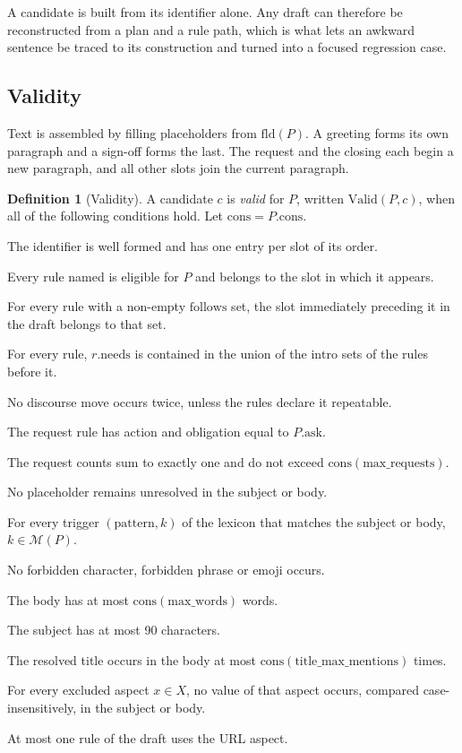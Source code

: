 \documentclass[11pt]{article}
\theoremstyle{definition}
\newtheorem{definition}[theorem]{Definition}
\theoremstyle{remark}
\newcommand{\Valid}{\mathrm{Valid}}
\newcommand{\Mset}{\mathcal{M}}
\begin{document}
A candidate is built from its identifier alone. Any draft can therefore be reconstructed from a plan and a rule path, which is what lets an awkward sentence be traced to its construction and turned into a focused regression case.

\subsection{Validity}

Text is assembled by filling placeholders from $\mathrm{fld}(P)$. A greeting forms its own paragraph and a sign-off forms the last. The request and the closing each begin a new paragraph, and all other slots join the current paragraph.

\begin{definition}[Validity]\label{def:valid2}
A candidate $c$ is \emph{valid} for $P$, written $\Valid(P,c)$, when all of the following conditions hold. Let $\mathrm{cons}=P.\mathrm{cons}$.
\begin{description}[leftmargin=1.2em,labelsep=0.6em,itemsep=0.1em]
\item[V1] The identifier is well formed and has one entry per slot of its order.
\item[V2] Every rule named is eligible for $P$ and belongs to the slot in which it appears.
\item[V3] For every rule with a non-empty $\mathrm{follows}$ set, the slot immediately preceding it in the draft belongs to that set.
\item[V4] For every rule, $r.\mathrm{needs}$ is contained in the union of the $\mathrm{intro}$ sets of the rules before it.
\item[V5] No discourse move occurs twice, unless the rules declare it repeatable.
\item[V6] The request rule has action and obligation equal to $P.\mathrm{ask}$.
\item[V7] The request counts sum to exactly one and do not exceed $\mathrm{cons}(\text{max\_requests})$.
\item[V8] No placeholder remains unresolved in the subject or body.
\item[V9] For every trigger $(\text{pattern},k)$ of the lexicon that matches the subject or body, $k\in\Mset(P)$.
\item[V10] No forbidden character, forbidden phrase or emoji occurs.
\item[V11] The body has at most $\mathrm{cons}(\text{max\_words})$ words.
\item[V12] The subject has at most 90 characters.
\item[V13] The resolved title occurs in the body at most $\mathrm{cons}(\text{title\_max\_mentions})$ times.
\item[V14] For every excluded aspect $x\in X$, no value of that aspect occurs, compared case-insensitively, in the subject or body.
\item[V15] At most one rule of the draft uses the URL aspect.
\end{description}
\end{definition}
\end{document}
